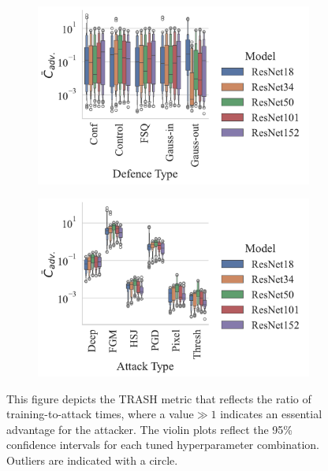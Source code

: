\begin{figure}[!h]
    \centering
    \begin{subfigure}
        \centering
        \includegraphics[width=.38\textwidth,trim={12pt 10pt 20pt 10pt},clip]{plots/trash_score_vs_defence_type.pdf}
    \end{subfigure}
    \begin{subfigure}
        \centering
        \includegraphics[width=.38\textwidth,trim={12pt 10pt 20pt 10pt},clip]{plots/trash_score_vs_attack_type.pdf}
    \end{subfigure}
    \caption{This figure depicts the TRASH metric that reflects the ratio of training-to-attack times, where a value$\gg 1 $  indicates an essential advantage for the attacker. The violin plots reflect the 95\% confidence intervals for each tuned hyperparameter combination. Outliers are indicated with a circle. }
    \label{fig:failures_per_train_time}
\end{figure}